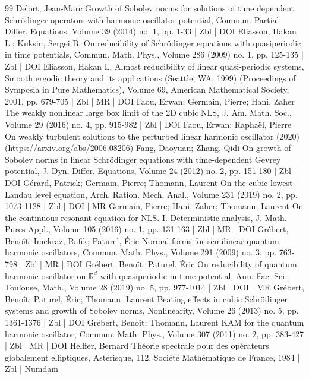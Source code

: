 \documentclass[10pt]{amsart}
\theoremstyle{definition}\newtheorem{defi}[theo]{Definition}\newtheorem{rema}[theo]{Remark}\newtheorem{exam}[theo]{Example}\newtheorem{exem}[theo]{Example}\newtheorem{nota}[theo]{Notation}
\newcommand{\<}{\langle}
\renewcommand{\>}{\rangle}
\begin{document}
\begin{thebibliography}{99}
Delort, Jean-Marc Growth of Sobolev norms for solutions of time dependent Schrödinger operators with harmonic oscillator potential, Commun. Partial Differ. Equations, Volume 39 (2014) no. 1, pp. 1-33 | Zbl | DOI
Eliasson, Hakan L.; Kuksin, Sergei B. On reducibility of Schrödinger equations with quasiperiodic in time potentials, Commun. Math. Phys., Volume 286 (2009) no. 1, pp. 125-135 | Zbl | DOI
Eliasson, Hakan L. Almost reducibility of linear quasi-periodic systems, Smooth ergodic theory and its applications (Seattle, WA, 1999) (Proceedings of Symposia in Pure Mathematics), Volume 69, American Mathematical Society, 2001, pp. 679-705 | Zbl | MR | DOI
Faou, Erwan; Germain, Pierre; Hani, Zaher The weakly nonlinear large box limit of the 2D cubic NLS, J. Am. Math. Soc., Volume 29 (2016) no. 4, pp. 915-982 | Zbl | DOI
Faou, Erwan; Raphaël, Pierre On weakly turbulent solutions to the perturbed linear harmonic oscillator (2020) (https://arxiv.org/abs/2006.08206)
Fang, Daoyuan; Zhang, Qidi On growth of Sobolev norms in linear Schrödinger equations with time-dependent Gevrey potential, J. Dyn. Differ. Equations, Volume 24 (2012) no. 2, pp. 151-180 | Zbl | DOI
Gérard, Patrick; Germain, Pierre; Thomann, Laurent On the cubic lowest Landau level equation, Arch. Ration. Mech. Anal., Volume 231 (2019) no. 2, pp. 1073-1128 | Zbl | DOI | MR
Germain, Pierre; Hani, Zaher; Thomann, Laurent On the continuous resonant equation for NLS. I. Deterministic analysis, J. Math. Pures Appl., Volume 105 (2016) no. 1, pp. 131-163 | Zbl | MR | DOI
Grébert, Benoît; Imekraz, Rafik; Paturel, Éric Normal forms for semilinear quantum harmonic oscillators, Commun. Math. Phys., Volume 291 (2009) no. 3, pp. 763-798 | Zbl | MR | DOI
Grébert, Benoît; Paturel, Éric On reducibility of quantum harmonic oscillator on ${\mathbb{R}}^d$ with quasiperiodic in time potential, Ann. Fac. Sci. Toulouse, Math., Volume 28 (2019) no. 5, pp. 977-1014 | Zbl | DOI | MR
Grébert, Benoît; Paturel, Éric; Thomann, Laurent Beating effects in cubic Schrödinger systems and growth of Sobolev norms, Nonlinearity, Volume 26 (2013) no. 5, pp. 1361-1376 | Zbl | DOI
Grébert, Benoît; Thomann, Laurent KAM for the quantum harmonic oscillator, Commun. Math. Phys., Volume 307 (2011) no. 2, pp. 383-427 | Zbl | MR | DOI
Helffer, Bernard Théorie spectrale pour des opérateurs globalement elliptiques, Astérisque, 112, Société Mathématique de France, 1984 | Zbl | Numdam

\end{thebibliography}
\end{document}
